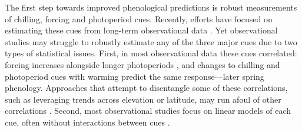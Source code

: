 \documentclass[11pt,letter]{article}
\begin{document}
The first step towards improved phenological predictions is robust measurements of chilling, forcing and photoperiod cues. Recently, efforts have focused on estimating these cues from long-term observational data \citep{Luedeling2009,lued2013diff}. Yet observational studies may struggle to robustly estimate any of the three major cues due to two types of statistical issues. First, in most observational data these cues correlated: forcing increases alongside longer photoperiods \citep{sarahailene2020}, and changes to chilling and photoperiod cues with warming predict the same response---later spring phenology. Approaches that attempt to disentangle some of these correlations, such as leveraging trends across elevation or latitude, may run afoul of other correlations \citep[][]{tansey2017}. Second, most observational studies focus on linear models of each cue, often without interactions between cues \citep{visser2001,polgar2014,asse2018}.\\ %

\end{document}
